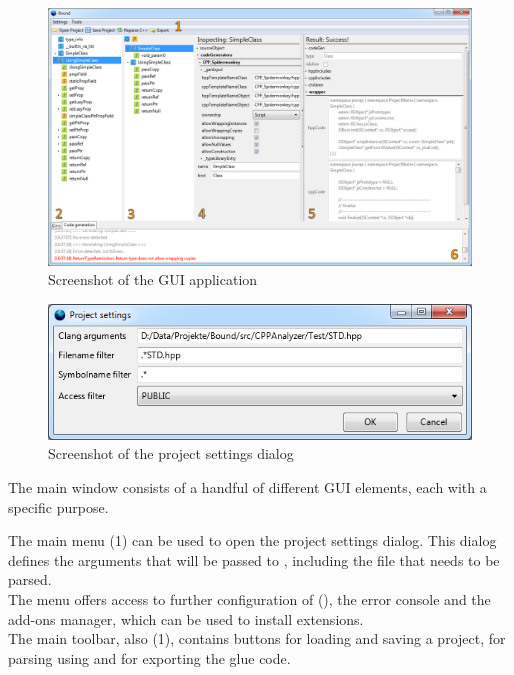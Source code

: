 \begin{figure}[h!] %
	\centering
		\includegraphics[scale=0.35]{Images/BoundGUI.png}
	\caption{Screenshot of the GUI application}
	\label{fig:BoundGUI}
\end{figure}

\begin{figure}[h!] %
	\centering
		\includegraphics[scale=0.5]{Images/ProjectSettings.png}
	\caption{Screenshot of the project settings dialog}
	\label{fig:ProjectSettings}
\end{figure}

The main window consists of a handful of different GUI elements, each with a specific purpose. 

The main menu (1) can be used to open the project settings dialog. This dialog defines the arguments that will be passed to , including the  file that needs to be parsed.\\
The  menu offers access to further configuration of  (), the  error console and the  add-ons manager, which can be used to install extensions.\\
The main toolbar, also (1), contains buttons for loading and saving a project, for parsing using  and for exporting the glue code.

